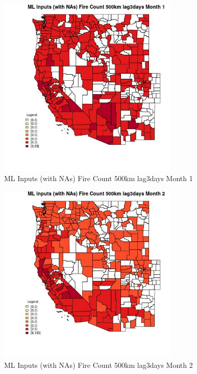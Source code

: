 \clearpage 

\begin{figure} 
\centering  
\includegraphics[width=0.77\textwidth]{Code_Outputs/Report_ML_input_PM25_Step4_part_e_de_duplicated_aves_compiled_2019-05-21wNAs_CountyFire_Count_500km_lag3daysmedianMonth1.jpg} 
\caption{\label{fig:Report_ML_input_PM25_Step4_part_e_de_duplicated_aves_compiled_2019-05-21wNAsCountyFire_Count_500km_lag3daysmedianMonth1}ML Inputs (with NAs) Fire Count 500km lag3days Month 1} 
\end{figure} 
 

\begin{figure} 
\centering  
\includegraphics[width=0.77\textwidth]{Code_Outputs/Report_ML_input_PM25_Step4_part_e_de_duplicated_aves_compiled_2019-05-21wNAs_CountyFire_Count_500km_lag3daysmedianMonth2.jpg} 
\caption{\label{fig:Report_ML_input_PM25_Step4_part_e_de_duplicated_aves_compiled_2019-05-21wNAsCountyFire_Count_500km_lag3daysmedianMonth2}ML Inputs (with NAs) Fire Count 500km lag3days Month 2} 
\end{figure} 
 

